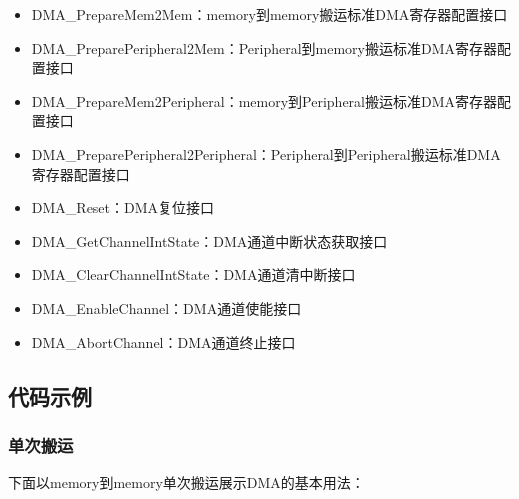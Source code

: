 \documentclass[
  12pt,
]{book}
\newenvironment{Shaded}{\begin{snugshade}}{\end{snugshade}}
\newcommand{\ControlFlowTok}[1]{\textcolor[rgb]{0.13,0.29,0.53}{\textbf{#1}}}
\newcommand{\DataTypeTok}[1]{\textcolor[rgb]{0.13,0.29,0.53}{#1}}
\newcommand{\DecValTok}[1]{\textcolor[rgb]{0.00,0.00,0.81}{#1}}
\newcommand{\NormalTok}[1]{#1}
\newcommand{\PreprocessorTok}[1]{\textcolor[rgb]{0.56,0.35,0.01}{\textit{#1}}}
\newcommand{\SpecialCharTok}[1]{\textcolor[rgb]{0.00,0.00,0.00}{#1}}
\newcommand{\StringTok}[1]{\textcolor[rgb]{0.31,0.60,0.02}{#1}}
\begin{document}
\begin{itemize}
\item
  DMA\_PrepareMem2Mem：memory到memory搬运标准DMA寄存器配置接口
\item
  DMA\_PreparePeripheral2Mem：Peripheral到memory搬运标准DMA寄存器配置接口
\item
  DMA\_PrepareMem2Peripheral：memory到Peripheral搬运标准DMA寄存器配置接口
\item
  DMA\_PreparePeripheral2Peripheral：Peripheral到Peripheral搬运标准DMA寄存器配置接口
\item
  DMA\_Reset：DMA复位接口
\item
  DMA\_GetChannelIntState：DMA通道中断状态获取接口
\item
  DMA\_ClearChannelIntState：DMA通道清中断接口
\item
  DMA\_EnableChannel：DMA通道使能接口
\item
  DMA\_AbortChannel：DMA通道终止接口
\end{itemize}

\hypertarget{ux4ee3ux7801ux793aux4f8b}{%
\subsection{代码示例}\label{ux4ee3ux7801ux793aux4f8b}}

\hypertarget{ux5355ux6b21ux642cux8fd0-1}{%
\subsubsection{单次搬运}\label{ux5355ux6b21ux642cux8fd0-1}}

下面以memory到memory单次搬运展示DMA的基本用法：

\begin{Shaded}
\end{Shaded}
\end{document}
